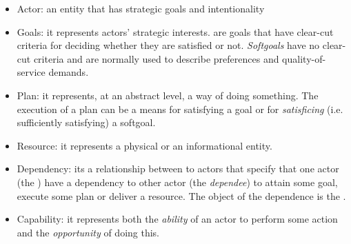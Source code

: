 \begin{itemize}
    \item Actor: an entity that has strategic goals and intentionality
    \item Goals: it represents actors’ strategic interests.  are goals that have clear-cut criteria for deciding whether they are satisfied or not. \textit{Softgoals} have no clear-cut criteria and are normally used to describe preferences and quality-of-service demands.

    \item Plan: it represents, at an abstract level, a way of doing something. The execution of a plan can be a means for satisfying a goal or for \textit{satisficing} (i.e. sufficiently satisfying) a softgoal.

    \item Resource: it represents a physical or an informational entity.

    \item Dependency: its a relationship between to actors that specify that one actor (the ) have a dependency to other actor (the \textit{dependee}) to attain some goal, execute some plan or deliver a resource. The object of the dependence is the .

    \item Capability: it represents both the \textit{ability} of an actor to perform some action and the \textit{opportunity} of doing this.

\end{itemize}
